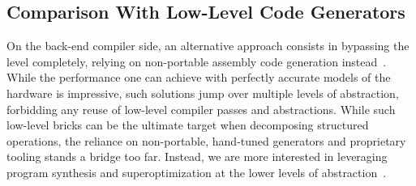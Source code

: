 \subsection{Comparison With Low-Level Code Generators}

On the back-end compiler side, an alternative approach consists in bypassing the \LLVM level completely, relying on non-portable assembly code generation instead~\cite{heinecke2016libxsmm}.
While the performance one can achieve with perfectly accurate models of the hardware is impressive, such solutions jump over multiple levels of abstraction, forbidding any reuse of low-level compiler passes and abstractions.
While such low-level bricks can be the ultimate target when decomposing structured operations, the reliance on non-portable, hand-tuned generators and proprietary tooling stands a bridge too far.
Instead, we are more interested in leveraging program synthesis and superoptimization at the lower levels of abstraction~\cite{SwizzleInventor,VGen}.
